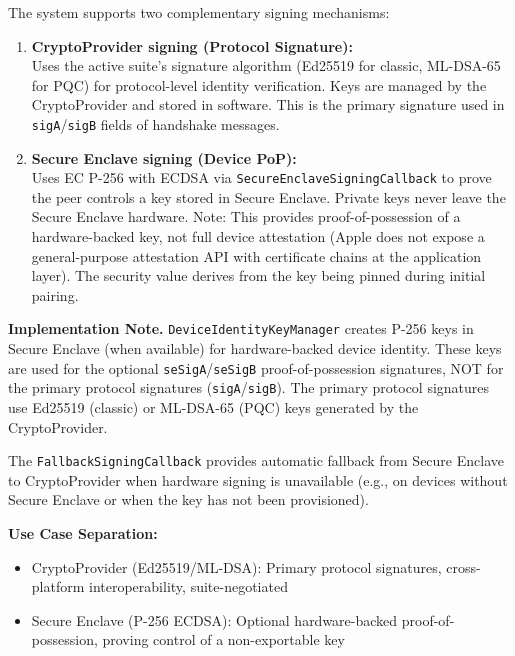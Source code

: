 \documentclass[10pt,journal,compsoc]{IEEEtran}
\providecommand{\tightlist}{%
	  \setlength{\itemsep}{0pt}\setlength{\parskip}{0pt}}
\begin{document}
The system supports two complementary signing mechanisms:

\begin{enumerate}
\item \raggedright
  \textbf{CryptoProvider signing (Protocol Signature):}\\
  Uses the active suite's signature algorithm (Ed25519 for classic, ML-DSA-65 for PQC)
  for protocol-level identity verification. Keys are managed by the
  CryptoProvider and stored in software. This is the primary signature
  used in \texttt{sigA}/\texttt{sigB} fields of handshake messages.
\item \raggedright
  \textbf{Secure Enclave signing (Device PoP):}\\
  Uses EC P-256 with ECDSA
  via \texttt{Secure\allowbreak Enclave\allowbreak Signing\allowbreak Callback} to prove the peer controls a
  key stored in Secure Enclave. Private keys never leave the Secure
  Enclave hardware. Note: This provides proof-of-possession of a
  hardware-backed key, not full device attestation (Apple does not
  expose a general-purpose attestation API with certificate chains at
  the application layer). The security value derives from the key being
  pinned during initial pairing.
\end{enumerate}

\textbf{Implementation Note.} \texttt{Device\allowbreak Identity\allowbreak Key\allowbreak Manager}
creates P-256 keys in Secure Enclave (when available) for hardware-backed
device identity. These keys are used for the optional
\texttt{seSigA}/\texttt{seSigB} proof-of-possession signatures, NOT for
the primary protocol signatures (\texttt{sigA}/\texttt{sigB}). The
primary protocol signatures use Ed25519 (classic) or ML-DSA-65 (PQC)
keys generated by the CryptoProvider.

The \texttt{Fallback\allowbreak Signing\allowbreak Callback} provides automatic fallback from
Secure Enclave to CryptoProvider when hardware signing is unavailable
(e.g., on devices without Secure Enclave or when the key has not been
provisioned).

\textbf{Use Case Separation:}
\begin{itemize}\tightlist
\item
  CryptoProvider (Ed25519/ML-DSA): Primary protocol signatures,
  cross-platform interoperability, suite-negotiated
\item
  Secure Enclave (P-256 ECDSA): Optional hardware-backed
  proof-of-possession, proving control of a non-exportable key
\end{itemize}
\end{document}
